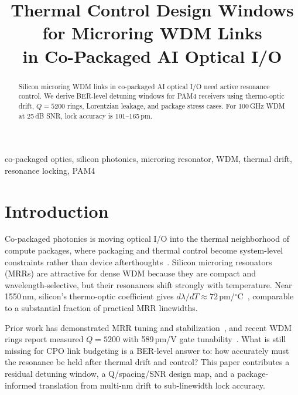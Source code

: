 \documentclass[conference]{IEEEtran}
\begin{document}
\title{Thermal Control Design Windows for Microring WDM Links\\in Co-Packaged AI Optical I/O}

\author{
}

\maketitle

\begin{abstract}
Silicon microring WDM links in co-packaged AI optical I/O need active resonance control. We derive BER-level detuning windows for PAM4 receivers using thermo-optic drift, $Q{=}5200$ rings, Lorentzian leakage, and package stress cases. For 100\,GHz WDM at 25\,dB SNR, lock accuracy is 101--165\,pm.
\end{abstract}

\begin{IEEEkeywords}
co-packaged optics, silicon photonics, microring resonator, WDM, thermal drift, resonance locking, PAM4
\end{IEEEkeywords}
\vspace{-5pt}

\section{Introduction}
Co-packaged photonics is moving optical I/O into the thermal neighborhood of compute packages, where packaging and thermal control become system-level constraints rather than device afterthoughts~\cite{mahajan2022,lee2023,matsumoto2022}. Silicon microring resonators (MRRs) are attractive for dense WDM because they are compact and wavelength-selective, but their resonances shift strongly with temperature. Near 1550\,nm, silicon's thermo-optic coefficient gives $d\lambda/dT\approx72$\,pm/$^\circ$C~\cite{komma2012}, comparable to a substantial fraction of practical MRR linewidths.

Prior work has demonstrated MRR tuning and stabilization~\cite{jayatilleka2015}, and recent WDM rings report measured $Q{=}5200$ with 589\,pm/V gate tunability~\cite{hsu2023}. What is still missing for CPO link budgeting is a BER-level answer to: how accurately must the resonance be held after thermal drift and control? This paper contributes a residual detuning window, a Q/spacing/SNR design map, and a package-informed translation from multi-nm drift to sub-linewidth lock accuracy.
\end{document}
